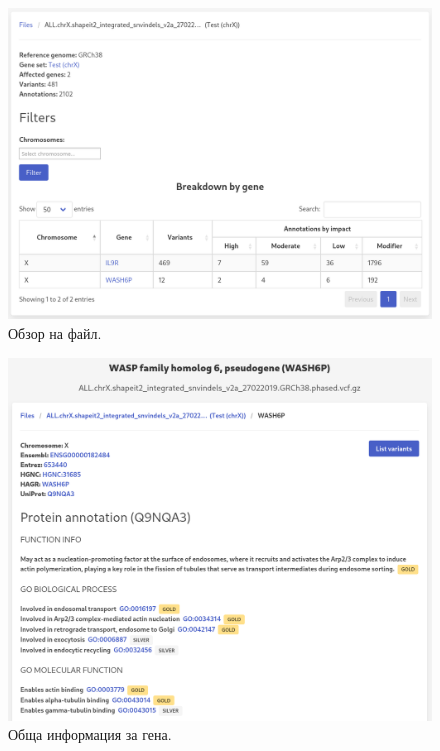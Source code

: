 \documentclass[pdftex,cyrillic,14pt,a4page,twoside,openright]{extreport}
\begin{document}
\begin{figure}[ht]
  \centering
  \includegraphics[width=16cm]{figures/file_summary}
  \caption {Обзор на файл.}
  \label{fig:file_summary}
\end{figure}

\begin{figure}[ht]
  \centering
  \includegraphics[width=16cm]{figures/gene_summary}
  \caption {Обща информация за гена.}
  \label{fig:gene_summary}
\end{figure}
\end{document}
